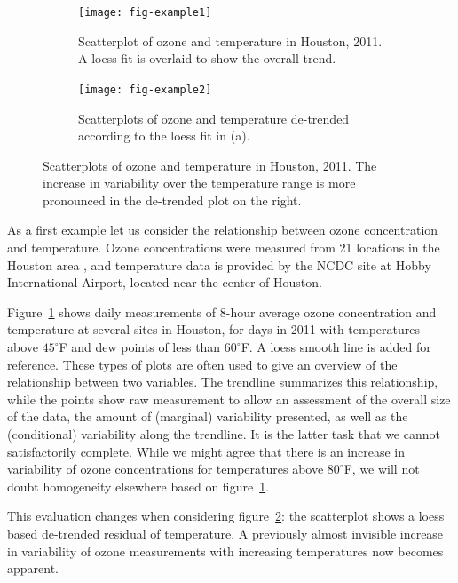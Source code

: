\documentclass[11pt]{isuthesis}\usepackage[]{graphicx}\usepackage[]{color}
\begin{document}
\begin{figure}[h!tbp]\centering
\begin{subfigure}[b]{.45\linewidth}
  \centering
  \texttt{[image: fig-example1]}
  \caption[Scatterplot of ozone and temperature in Houston, 2011.]{\small Scatterplot of ozone and temperature in Houston, 2011. A loess fit is overlaid to show the overall trend.  \label{fig:example1}}
\end{subfigure}\hfill
\begin{subfigure}[b]{.45\linewidth}
  \centering
  \texttt{[image: fig-example2]}
  \caption[Residual Ozone]{\small Scatterplots of ozone and temperature de-trended according to the loess fit in (a). \\ \phantom{text to get to the next line}
  \label{fig:example2}}
\end{subfigure}
\caption[Scatterplots of ozone and temperature in Houston, 2011]{\label{fig:exampleFull1} Scatterplots of ozone and temperature in Houston, 2011. The increase in variability over the temperature range is more pronounced in the de-trended plot on the right.}
\end{figure}

As a first example let us consider the relationship between ozone concentration and temperature. Ozone concentrations were measured from 21 locations in the Houston area \citep{epa}, and temperature data is provided by the NCDC \citep{noaa} site at Hobby International Airport, located near the center of Houston. 

Figure~\ref{fig:example1} shows daily measurements of 8-hour average ozone concentration and temperature at several sites in Houston, for days in 2011 with temperatures above $45^\circ$F  and dew points of less than $60^\circ$F. 
A loess smooth line is added for reference. 
These types of plots are often used to give an overview of the relationship between two variables. The trendline summarizes this relationship, while the points show raw measurement to allow an assessment of the overall size of the data, the amount of (marginal) variability presented, as well as the (conditional) variability along the trendline. It is the latter task that we cannot satisfactorily complete. While we might agree that there is an increase in variability of ozone concentrations for temperatures above $80^\circ$F, we will not doubt homogeneity  elsewhere based on figure~\ref{fig:example1}. 


This evaluation changes when considering figure~\ref{fig:example2}: the scatterplot shows a loess based de-trended residual of temperature. A previously almost invisible increase in variability of ozone measurements with increasing temperatures now becomes apparent.
\end{document}

